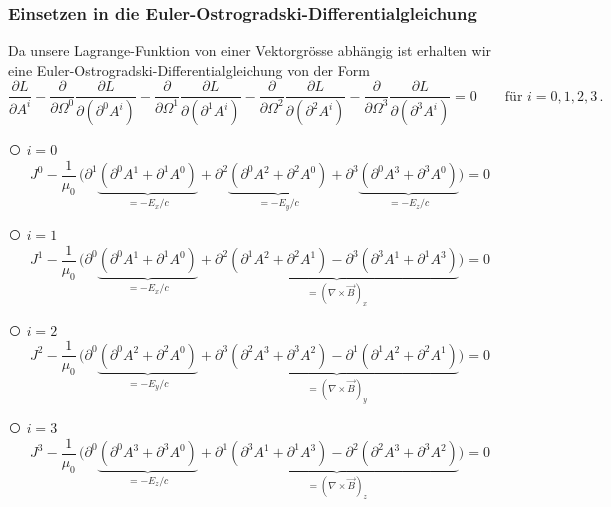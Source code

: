 \subsubsection{Einsetzen in die Euler-Ostrogradski-Differentialgleichung}
Da unsere Lagrange-Funktion von einer Vektorgrösse abhängig ist erhalten wir eine Euler-Ostrogradski-Differentialgleichung von der Form
\[
\frac{\partial L}{\partial A^i} 
- \frac{\partial}{\partial \Omega^0}\frac{\partial L}{\partial(\partial^0 A^i)}
- \frac{\partial}{\partial \Omega^1}\frac{\partial L}{\partial(\partial^1 A^i)}
- \frac{\partial}{\partial \Omega^2}\frac{\partial L}{\partial(\partial^2 A^i)}
- \frac{\partial}{\partial \Omega^3}\frac{\partial L}{\partial(\partial^3 A^i)}
= 0 \qquad \text{für } i=0,1,2,3 \,.
\]

{\larger\textcircled{}} $i = 0$
\[
J^0  -\frac{1}{\mu_0}\,\biggl(\partial^1\underbrace{\left(\partial^0 A^1 + \partial^1 A^0\right)}_{\displaystyle=-E_x/c}
+ \partial^2\underbrace{\left(\partial^0 A^2 + \partial^2 A^0\right)}_{\displaystyle=-E_y/c}
+ \partial^3\underbrace{\left(\partial^0 A^3 + \partial^3 A^0\right)}_{\displaystyle=-E_z/c}\biggr)
=
0
\]

{\larger\textcircled{}} $i = 1$
\[
J^1  -\frac{1}{\mu_0}\,\biggl(\partial^0\underbrace{\left(\partial^0 A^1 + \partial^1 A^0\right)}_{\displaystyle=-E_x/c}
+ \underbrace{\partial^2\left(\partial^1 A^2 + \partial^2 A^1\right)
	- \partial^3\left(\partial^3 A^1 + \partial^1 A^3\right)}_{\displaystyle=(\nabla\times\vec{B})_x}\biggr)
=
0
\]

{\larger\textcircled{}} $i = 2$
\[
J^2  -\frac{1}{\mu_0}\,\biggl(\partial^0\underbrace{\left(\partial^0 A^2 + \partial^2 A^0\right)}_{\displaystyle=-E_y/c}
+ \underbrace{\partial^3\left(\partial^2 A^3 + \partial^3 A^2\right)
	- \partial^1\left(\partial^1 A^2 + \partial^2 A^1\right)}_{\displaystyle=(\nabla\times\vec{B})_y}\biggr)
=
0
\]

{\larger\textcircled{}} $i = 3$
\[
J^3  -\frac{1}{\mu_0}\,\biggl(\partial^0\underbrace{\left(\partial^0 A^3 + \partial^3 A^0\right)}_{\displaystyle=-E_z/c}
+ \underbrace{\partial^1\left(\partial^3 A^1 + \partial^1 A^3\right)
	- \partial^2\left(\partial^2 A^3 + \partial^3 A^2\right)}_{\displaystyle=(\nabla\times\vec{B})_z}\biggr)
=
0
\]

